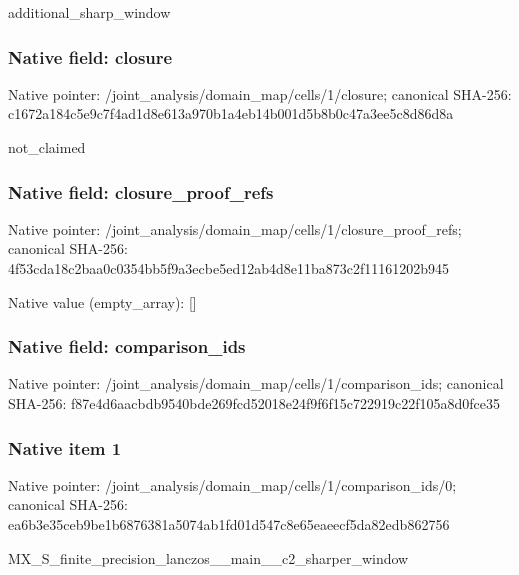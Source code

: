 \documentclass[10pt,a4paper]{article}
\begin{document}
\begingroup\raggedright\sloppy additional\_\allowbreak{}sharp\_\allowbreak{}window\par\endgroup

\subsubsection{Native field: closure}
Native pointer: /joint\_\allowbreak{}analysis/domain\_\allowbreak{}map/cells/1/closure; canonical SHA-256: c1672a184c5e9c7f4ad1d8e613a970b1a4eb14b001d5b8b0c47a3ee5c8d86d8a

\begingroup\raggedright\sloppy not\_\allowbreak{}claimed\par\endgroup

\subsubsection{Native field: closure\_\allowbreak{}proof\_\allowbreak{}refs}
Native pointer: /joint\_\allowbreak{}analysis/domain\_\allowbreak{}map/cells/1/closure\_\allowbreak{}proof\_\allowbreak{}refs; canonical SHA-256: 4f53cda18c2baa0c0354bb5f9a3ecbe5ed12ab4d8e11ba873c2f11161202b945

Native value (empty\_\allowbreak{}array): []

\subsubsection{Native field: comparison\_\allowbreak{}ids}
Native pointer: /joint\_\allowbreak{}analysis/domain\_\allowbreak{}map/cells/1/comparison\_\allowbreak{}ids; canonical SHA-256: f87e4d6aacbdb9540bde269fcd52018e24f9f6f15c722919c22f105a8d0fce35

\subsubsection{Native item 1}
Native pointer: /joint\_\allowbreak{}analysis/domain\_\allowbreak{}map/cells/1/comparison\_\allowbreak{}ids/0; canonical SHA-256: ea6b3e35ceb9be1b6876381a5074ab1fd01d547c8e65eaeecf5da82edb862756

\begingroup\raggedright\sloppy MX\_\allowbreak{}S\_\allowbreak{}finite\_\allowbreak{}precision\_\allowbreak{}lanczos\_\allowbreak{}\_\allowbreak{}main\_\allowbreak{}\_\allowbreak{}c2\_\allowbreak{}sharper\_\allowbreak{}window\par\endgroup
\end{document}
